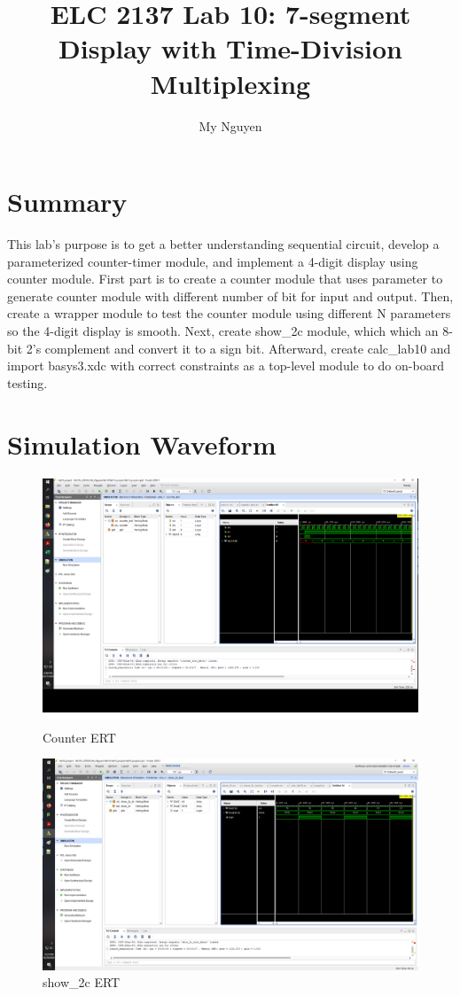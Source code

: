 \documentclass[11pt]{article}
\begin{document}
\title{ELC 2137 Lab 10: 7-segment Display with Time-Division Multiplexing}
\author{My Nguyen}

\maketitle

\section*{Summary}
This lab's purpose is to get a better understanding sequential circuit, develop a parameterized counter-timer module, and implement a 4-digit display using counter module. First part is to create a counter module that uses parameter to generate counter module with different number of bit for input and output. Then, create a wrapper module to test the counter module using different N parameters so the 4-digit display is smooth. Next, create show\_2c module, which which an 8-bit 2's complement and convert it to a sign bit. Afterward, create calc\_lab10 and import basys3.xdc with correct constraints as a top-level module to do on-board testing.

\section*{Simulation Waveform}
\begin{figure}[ht]
	\centering
	\includegraphics[width=\textwidth,trim=24cm 22.5cm 0.5cm 5.5cm,clip]{"counter"}
	\caption{Counter ERT}
	\includegraphics[width=\textwidth,trim=24cm 20cm 0.5cm 5.5cm,clip]{"show_2c"}
	\caption{show\_2c ERT}
\end{figure}
\end{document}
